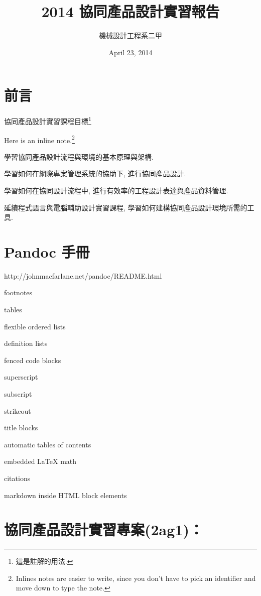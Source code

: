 \documentclass[]{article}
\title{2014 協同產品設計實習報告}
\author{機械設計工程系二甲}
\date{April 23, 2014}
\begin{document}
\maketitle

{
\hypersetup{linkcolor=black}
\setcounter{tocdepth}{3}
\tableofcontents
}
\section{前言}\label{ux524dux8a00}

協同產品設計實習課程目標\footnote{這是註解的用法.}

Here is an inline note.\footnote{Inlines notes are easier to write,
  since you don't have to pick an identifier and move down to type the
  note.}

學習協同產品設計流程與環境的基本原理與架構.

學習如何在網際專案管理系統的協助下, 進行協同產品設計.

學習如何在協同設計流程中, 進行有效率的工程設計表達與產品資料管理.

延續程式語言與電腦輔助設計實習課程,
學習如何建構協同產品設計環境所需的工具.

\section{Pandoc 手冊}\label{pandoc-ux624bux518a}

http://johnmacfarlane.net/pandoc/README.html

footnotes

tables

flexible ordered lists

definition lists

fenced code blocks

superscript

subscript

strikeout

title blocks

automatic tables of contents

embedded LaTeX math

citations

markdown inside HTML block elements

\section{協同產品設計實習專案(2ag1)：}\label{ux5354ux540cux7522ux54c1ux8a2dux8a08ux5be6ux7fd2ux5c08ux68482ag1}
\end{document}
